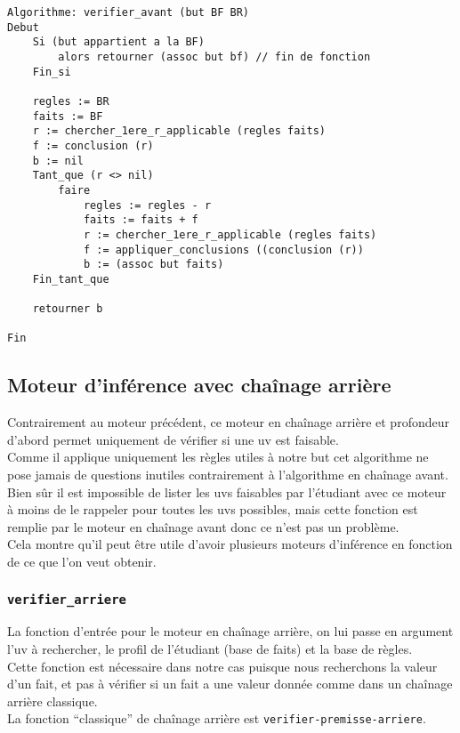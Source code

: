 \documentclass[a4paper, 12pt, final]{article}
\begin{document}
\begin{verbatim}
Algorithme: verifier_avant (but BF BR) 
Debut
    Si (but appartient a la BF)
        alors retourner (assoc but bf) // fin de fonction
    Fin_si
    
    regles := BR
    faits := BF
    r := chercher_1ere_r_applicable (regles faits)
    f := conclusion (r)
    b := nil
    Tant_que (r <> nil)
        faire
            regles := regles - r
            faits := faits + f
            r := chercher_1ere_r_applicable (regles faits)
            f := appliquer_conclusions ((conclusion (r))
            b := (assoc but faits)
    Fin_tant_que
    
    retourner b

Fin
\end{verbatim}

\subsection{Moteur d'inférence avec chaînage arrière}
Contrairement au moteur précédent, ce moteur en chaînage arrière et
profondeur d'abord permet uniquement de vérifier si une uv est
faisable.\\
Comme il applique uniquement les règles utiles à notre but cet
algorithme ne pose jamais de questions inutiles contrairement à
l'algorithme en chaînage avant.\\
Bien sûr il est impossible de lister les uvs faisables par l'étudiant avec ce moteur
à moins de le rappeler pour toutes les uvs possibles, mais cette
fonction est remplie par le moteur en chaînage avant donc ce n'est pas
un problème.\\
Cela montre qu'il peut être utile d'avoir plusieurs moteurs
d'inférence en fonction de ce que l'on veut obtenir.

\subsubsection{\texttt{verifier\_arriere}}
La fonction d'entrée pour le moteur en chaînage arrière, on lui passe en argument l'uv à rechercher, le
profil de l'étudiant (base de faits) et la base de règles.\\
Cette fonction est nécessaire dans notre cas puisque nous recherchons
la valeur d'un fait, et pas à vérifier si un fait a une valeur donnée
comme dans un chaînage arrière classique.\\
La fonction ``classique'' de chaînage arrière est \texttt{verifier-premisse-arriere}.
\end{document}
